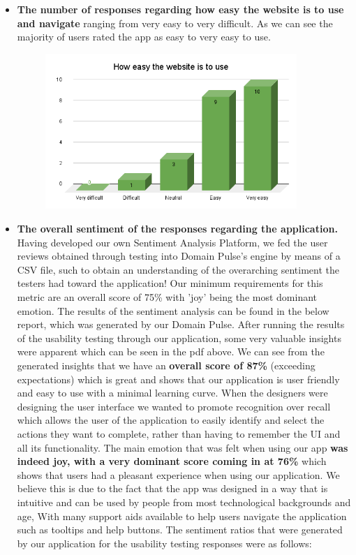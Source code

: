 \documentclass[12pt]{article}
\begin{document}
\begin{itemize}
\begin{figure}[H]
          \end{figure}
    \item \textbf{The number of responses regarding how easy the website is to use and navigate} ranging from very easy to very difficult. As we can see the majority of users rated the app as easy to very easy to use.
          \begin{figure}[H]
              \centering
              \includegraphics[width=0.9\textwidth]{How easy the website is to use.png}
          \end{figure}
    \item \textbf{The overall sentiment of the responses regarding the application.} Having developed our own Sentiment Analysis Platform, we fed the user reviews obtained through testing into Domain Pulse's engine by means of a CSV file, such to obtain an understanding of the overarching sentiment the testers had toward the application! Our minimum requirements for this metric are an overall score of 75\% with 'joy' being the most dominant emotion. The results of the sentiment analysis can be found in the below report, which was generated by our Domain Pulse. After running the results of the usability testing through our application, some very valuable insights were apparent which can be seen in the pdf above. We can see from the generated insights that we have an \textbf{overall score of 87\%} (exceeding expectations) which is great and shows that our application is user friendly and easy to use with a minimal learning curve. When the designers were designing the user interface we wanted to promote recognition over recall which allows the user of the application to easily identify and select the actions they want to complete, rather than having to remember the UI and all its functionality. The main emotion that was felt when using our app \textbf{was indeed joy, with a very dominant score coming in at 76\%} which shows that users had a pleasant experience when using our application. We believe this is due to the fact that the app was designed in a way that is intuitive and can be used by people from most technological backgrounds and age, With many support aids available to help users navigate the application such as tooltips and help buttons. The sentiment ratios that were generated by our application for the usability testing responses were as follows:

\end{itemize}
\end{document}
